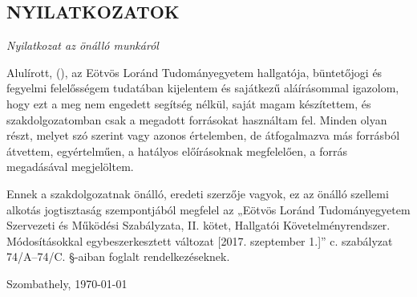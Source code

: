 \selecthungarian
{}
\setcounter{page}{6}
\cleardoublepage %
\begin{center}
\section*{NYILATKOZATOK}
\end{center}

\vspace{0.5cm}



\begin{center}
\emph{Nyilatkozat az önálló munkáról}
\end{center}
Alulírott,  \emph{\authorFamilyName{} \authorGivenName} (\neptun), az Eötvös Loránd Tudományegyetem hallgatója, büntetőjogi és fegyelmi felelősségem tudatában kijelentem és sajátkezű aláírásommal igazolom, hogy ezt a \MakeLowercase{\munkatipustHU} meg nem engedett segítség nélkül, saját magam készítettem, és szakdolgozatomban csak a megadott forrásokat használtam fel. Minden olyan részt, melyet szó szerint vagy azonos értelemben, de átfogalmazva más forrásból átvettem, egyértelműen, a hatályos előírásoknak megfelelően, a forrás megadásával megjelöltem.

Ennek a szakdolgozatnak önálló, eredeti szerzője vagyok, ez az önálló szellemi alkotás jogtisztaság szempontjából megfelel az „Eötvös Loránd Tudományegyetem Szervezeti és Működési Szabályzata, II. kötet, Hallgatói Követelményrendszer. Módosításokkal egybeszerkesztett változat [2017. szeptember 1.]” c. szabályzat 74/A–74/C. §-aiban foglalt rendelkezéseknek.

\begin{flushleft}
Szombathely, \today
\end{flushleft}

\begin{flushright}
 \makebox[7cm]{\rule{6cm}{.4pt}}\\
\end{flushright}


\vfill
\clearpage

\selectthesislanguage

\setcounter{romanPage}{\value{page}}
